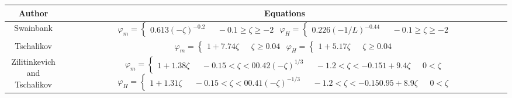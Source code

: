 {
\begin{table}[p]
\center
\centering
\scriptsize
    \begin{tabular}{| c | c |}
    \hline
        \rowcolor[HTML]{F3F3F3} \textbf{Author} & \textbf{Equations} \\ \hline
        \shortstack{Swainbank \\ \citep{foken:2008}} & \shortstack{$\varphi_{m} = \begin{cases} 0.613(-\zeta)^{-0.2} & \text{    } -0.1 \geq \zeta \geq -2 \\ \end{cases}$ \\ $\varphi_{H} = \begin{cases} 0.226 (-1/L)^{-0.44} & \text{    } -0.1 \geq \zeta \geq -2 \\ \end{cases}$} \\ 
        \hline
        \shortstack{Tschalikov \\ \citep{foken:2008}}  & \shortstack{$\varphi_{m} = \begin{cases} 1 + 7.74\zeta & \text{    } \zeta \geq 0.04 \\ \end{cases}$\\$\varphi_{H} = \begin{cases} 1 + 5.17\zeta & \text{    } \zeta \geq 0.04 \\ \end{cases}$ } \\ 
                \hline
                \shortstack{Zilitinkevich and \\ Tschalikov \\ \citep{zilitinkevitsch:1968}}  & \shortstack{$\varphi_{m} = \begin{cases} 1 + 1.38 \zeta & \text{    } -0.15 < \zeta < 0 \\ 0.42(-\zeta)^{1/3} & \text{    } -1.2 < \zeta < -0.15 \\ 1 + 9.4 \zeta & \text{    } 0 < \zeta \\ \end{cases}$\\$\varphi_{H} = \begin{cases} 1 + 1.31 \zeta & \text{    } -0.15 < \zeta < 0 \\ 0.41(-\zeta)^{-1/3} & \text{    } -1.2 < \zeta < -0.15 \\ 0.95 + 8.9 \zeta & \text{    } 0 < \zeta \\ \end{cases}$ } \\ 

\end{tabular}
\end{table}}

